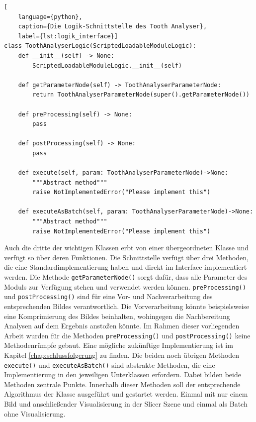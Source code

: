\pagebreak

\begin{lstlisting}[
    language={python},
    caption={Die Logik-Schnittstelle des Tooth Analyser},
    label={lst:logik_interface}]
class ToothAnalyserLogic(ScriptedLoadableModuleLogic):
    def __init__(self) -> None:
        ScriptedLoadableModuleLogic.__init__(self)

    def getParameterNode(self) -> ToothAnalyserParameterNode:
        return ToothAnalyserParameterNode(super().getParameterNode())

    def preProcessing(self) -> None:
        pass

    def postProcessing(self) -> None:
        pass

    def execute(self, param: ToothAnalyserParameterNode)->None:
        """Abstract method"""
        raise NotImplementedError("Please implement this")

    def executeAsBatch(self, param: ToothAnalyserParameterNode)->None:
        """Abstract method"""
        raise NotImplementedError("Please implement this")
\end{lstlisting}

Auch die dritte der wichtigen Klassen erbt von einer übergeordneten Klasse und verfügt
so über deren Funktionen. Die Schnittstelle verfügt über drei Methoden, die eine
Standardimplementierung haben und direkt im Interface implementiert werden. Die
Methode \texttt{getParameterNode()} sorgt dafür, dass alle Parameter des Moduls
zur Verfügung stehen und verwendet werden können. \texttt{preProcessing()} und
\texttt{postProcessing()} sind für eine Vor- und Nachverarbeitung des
entsprechenden Bildes verantwortlich. Die Vorverarbeitung könnte beispielsweise eine
Komprimierung des Bildes beinhalten, wohingegen die Nachbereitung Analysen auf
dem Ergebnis anstoßen könnte. Im Rahmen dieser vorliegenden Arbeit wurden für die
Methoden \texttt{preProcessing()} und \texttt{postProcessing()} keine Methodenrümpfe
gebaut. Eine mögliche zukünftige Implementierung ist im Kapitel
\ref{chap:schlussfolgerung} zu finden. Die beiden noch übrigen Methoden \texttt{execute()}
und \texttt{executeAsBatch()} sind abstrakte Methoden, die eine Implementierung
in den jeweiligen Unterklassen erfordern. Dabei bilden beide Methoden zentrale Punkte.
Innerhalb dieser Methoden soll der entsprechende Algorithmus der Klasse
ausgeführt und gestartet werden. Einmal mit nur einem Bild und anschließender Visualisierung
in der Slicer Szene und einmal als Batch ohne Visualisierung.

